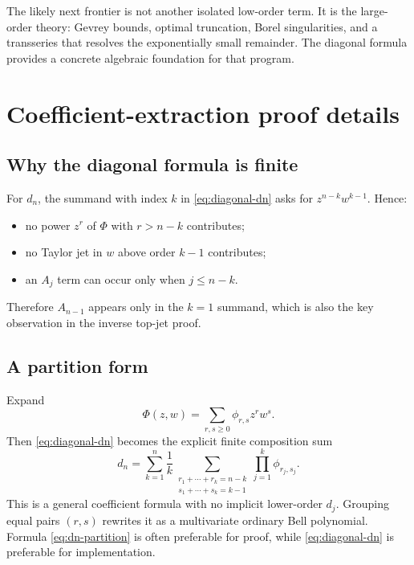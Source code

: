\documentclass[11pt,oneside]{article}
\numberwithin{equation}{section}
\theoremstyle{definition}
\theoremstyle{remark}
\begin{document}
The likely next frontier is not another isolated low-order term.  It is the large-order theory: Gevrey bounds, optimal truncation, Borel singularities, and a transseries that resolves the exponentially small remainder.  The diagonal formula provides a concrete algebraic foundation for that program.

\appendix

\section{Coefficient-extraction proof details}
\label{app:proof-details}

\subsection{Why the diagonal formula is finite}
For $d_n$, the summand with index $k$ in \cref{eq:diagonal-dn} asks for
$z^{n-k}w^{k-1}$.  Hence:
\begin{itemize}
\item no power $z^r$ of $\Phi$ with $r>n-k$ contributes;
\item no Taylor jet in $w$ above order $k-1$ contributes;
\item an $A_j$ term can occur only when $j\le n-k$.
\end{itemize}
Therefore $A_{n-1}$ appears only in the $k=1$ summand, which is also the key observation in the inverse top-jet proof.

\subsection{A partition form}
Expand
\begin{equation}
 \Phi(z,w)=\sum_{r,s\ge0}\phi_{r,s}z^rw^s.
 \label{eq:Phi-bivariate}
\end{equation}
Then \cref{eq:diagonal-dn} becomes the explicit finite composition sum
\begin{equation}
 d_n=\sum_{k=1}^{n}\frac1k
 \sum_{\substack{r_1+\cdots+r_k=n-k\\
 s_1+\cdots+s_k=k-1}}
 \prod_{j=1}^{k}\phi_{r_j,s_j}.
 \label{eq:dn-partition}
\end{equation}
This is a general coefficient formula with no implicit lower-order $d_j$.  Grouping equal pairs $(r,s)$ rewrites it as a multivariate ordinary Bell polynomial.  Formula \cref{eq:dn-partition} is often preferable for proof, while \cref{eq:diagonal-dn} is preferable for implementation.
\end{document}
